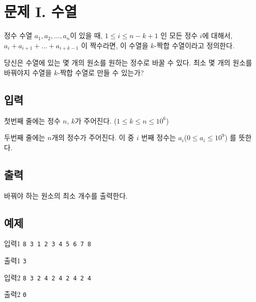 \documentclass{article}
\begin{document}
\newpage


\section{문제 I. 수열}
정수 수열 $a_1, a_2, ..., a_n$이 있을 때, $1 \leq i \leq n-k+1$ 인 모든 정수 $i$에 대해서, $a_{i} + a_{i+1} + ... + a_{i+k-1}$ 이 짝수라면, 이 수열을 $k$-짝합 수열이라고 정의한다. \newline

당신은 수열에 있는 몇 개의 원소를 원하는 정수로 바꿀 수 있다. 최소 몇 개의 원소를 바꿔야지 수열을 $k$-짝합 수열로 만들 수 있는가?

\subsection{입력}
첫번째 줄에는 정수 $n$, $k$가 주어진다. ($1 \leq k \leq n \leq 10^6$) \newline

두번째 줄에는 $n$개의 정수가 주어진다. 이 중 $i$ 번째 정수는 $a_i$($0 \leq a_i \leq 10^9$) 를 뜻한다.


\subsection{출력}
바꿔야 하는 원소의 최소 개수를 출력한다.

\subsection{예제}
입력1
\bgroup\obeylines
\texttt{8 3
	1 2 3 4 5 6 7 8	\newline}
\egroup

출력1
\bgroup\obeylines
\texttt{3\newline}
\egroup


입력2
\bgroup\obeylines
\texttt{8 3
	2 4 2 4 2 4 2 4\newline}
\egroup

출력2
\bgroup\obeylines
\texttt{0\newline}
\egroup

\newpage

\end{document}

